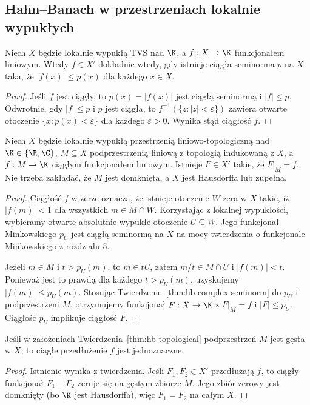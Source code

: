 \subsection{Hahn--Banach w przestrzeniach lokalnie wypukłych}

\begin{stwierdzenie}
\label{prop:dual-seminorm-criterion}
Niech $X$ będzie lokalnie wypukłą TVS nad $\K$,
a $f:X\to\K$ funkcjonałem liniowym. Wtedy
$f\in X'$ dokładnie wtedy, gdy istnieje ciągła
seminorma $p$ na $X$ taka, że
$|f(x)|\le p(x)$ dla każdego $x\in X$.
\end{stwierdzenie}
\begin{proof}
Jeśli $f$ jest ciągły, to $p(x)=|f(x)|$ jest
ciągłą seminormą i $|f|\le p$. Odwrotnie, gdy
$|f|\le p$ i $p$ jest ciągła, to
$f^{-1}(\{z:|z|<\varepsilon\})$ zawiera otwarte
otoczenie $\{x:p(x)<\varepsilon\}$ dla każdego
$\varepsilon>0$. Wynika stąd ciągłość $f$.
\end{proof}

\begin{twierdzenie}\label{thm:hb-topological}
Niech $X$ będzie lokalnie wypukłą przestrzenią
liniowo-topologiczną nad $\K\in\{\R,\C\}$,
$M\subseteq X$ podprzestrzenią liniową z topologią
indukowaną z $X$, a $f:M\to\K$ ciągłym funkcjonałem
liniowym. Istnieje $F\in X'$ takie, że $F|_M=f$.
Nie trzeba zakładać, że $M$ jest domknięta, a $X$
jest Hausdorffa lub zupełna.
\end{twierdzenie}
\begin{proof}
Ciągłość $f$ w zerze oznacza, że istnieje otoczenie
$W$ zera w $X$ takie, iż $|f(m)|<1$ dla wszystkich
$m\in M\cap W$. Korzystając z lokalnej wypukłości,
wybieramy otwarte absolutnie wypukłe otoczenie
$U\subseteq W$. Jego funkcjonał Minkowskiego $p_U$
jest ciągłą seminormą na $X$ na mocy
twierdzenia o funkcjonale Minkowskiego z \hyperref[sec:lokalnie-wypukle]{rozdziału 5}.

Jeżeli $m\in M$ i $t>p_U(m)$, to $m\in tU$,
zatem $m/t\in M\cap U$ i $|f(m)|<t$.
Ponieważ jest to prawdą dla każdego $t>p_U(m)$,
uzyskujemy $|f(m)|\le p_U(m)$.
Stosując Twierdzenie~\ref{thm:hb-complex-seminorm}
do $p_U$ i podprzestrzeni $M$, otrzymujemy funkcjonał
$F:X\to\K$ z $F|_M=f$ i $|F|\le p_U$.
Ciągłość $p_U$ implikuje ciągłość $F$.
\end{proof}

\begin{wniosek}
\label{cor:dense-extension}
Jeśli w założeniach Twierdzenia~\ref{thm:hb-topological}
podprzestrzeń $M$ jest gęsta w $X$, to ciągłe
przedłużenie $f$ jest jednoznaczne.
\end{wniosek}
\begin{proof}
Istnienie wynika z twierdzenia. Jeśli $F_1,F_2\in X'$
przedłużają $f$, to ciągły funkcjonał $F_1-F_2$
zeruje się na gęstym zbiorze $M$. Jego zbiór zerowy
jest domknięty (bo $\K$ jest Hausdorffa), więc
$F_1=F_2$ na całym $X$.
\end{proof}

